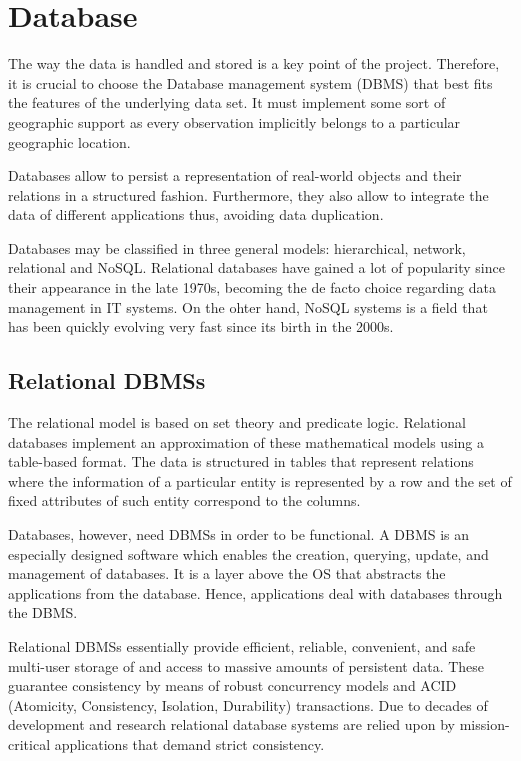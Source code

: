 \section{Database}

The way the data is handled and stored is a key point of the project. Therefore, it is crucial to choose the Database management system (DBMS) that best fits the features of the underlying data set. It must implement some sort of geographic support as every observation implicitly belongs to a particular geographic location.

Databases allow to persist a representation of real-world objects and their relations in a structured fashion. Furthermore, they also allow to integrate the data of different applications thus, avoiding data duplication.

Databases may be classified in three general models: hierarchical, network, relational and NoSQL. Relational databases have gained a lot of popularity since their appearance in the late 1970s, becoming the de facto choice regarding data management in IT systems. On the ohter hand, NoSQL systems is a field that has been quickly evolving very fast since its birth in the 2000s.

\subsection{Relational DBMSs}

The relational model is based on set theory and predicate logic. Relational databases implement an approximation of these mathematical models using a table-based format. The data is structured in tables that represent relations where the information of a particular entity is represented by a row and the set of fixed attributes of such entity correspond to the columns.

Databases, however, need DBMSs in order to be functional. A DBMS is an especially designed software which enables the creation, querying, update, and management of databases. It is a layer above the OS that abstracts the applications from the database. Hence, applications deal with databases through the DBMS.

Relational DBMSs essentially provide efficient, reliable, convenient, and safe multi-user storage of and access to massive amounts of persistent data. These guarantee consistency by means of robust concurrency models and ACID (Atomicity, Consistency, Isolation, Durability) transactions. Due to decades of development and research relational database systems are relied upon by mission-critical applications that demand strict consistency.

